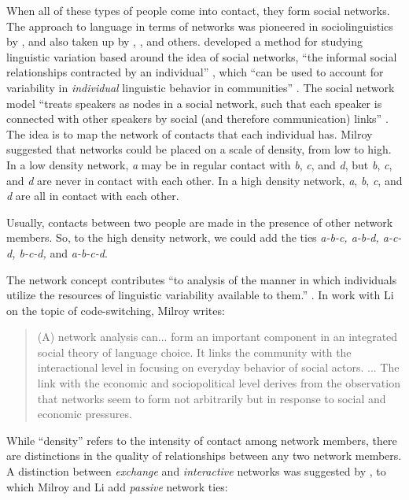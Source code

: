 When all of these types of people come into contact, they form social networks. The approach to language in terms of networks was pioneered in sociolinguistics by \citet{milroy_language_1980}, and also taken up by \citet{le_page_acts_1985}, \citet{ross_social_1997}, and others. \citet{milroy_language_1980} developed a method for studying linguistic variation based around the idea of social networks, ``the informal social relationships contracted by an individual'' \citep[174]{milroy_language_1980}, which ``can be used to account for variability in \textit{individual }linguistic behavior in communities'' \citep[21]{milroy_language_1980}. The social network model ``treats speakers as nodes in a social network, such that each speaker is connected with other speakers by social (and therefore communication) links'' \citep[213]{ross_social_1997}. The idea is to map the network of contacts that each individual has. Milroy suggested that networks could be placed on a scale of density, from low to high. In a low density network, \textit{a} may be in regular contact with \textit{b}, \textit{c}, and \textit{d}, but \textit{b}, \textit{c}, and \textit{d} are never in contact with each other. In a high density network, \textit{a}, \textit{b}, \textit{c}, and \textit{d} are all in contact with each other.

Usually, contacts between two people are made in the presence of other network members. So, to the high density network, we could add the ties \textit{a-b-c, a-b-d, a-c-d, b-c-d, }and \textit{a-b-c-d}.

The network concept contributes ``to analysis of the manner in which individuals utilize the resources of linguistic variability available to them.'' \citep[175]{milroy_language_1980}. In work with Li on the topic of code-switching, Milroy writes:

	\begin{quotation} (A) network analysis can... form an important component in an integrated social theory of language choice. It links the community with the interactional level in focusing on everyday behavior of social actors. ...  The link with the economic and sociopolitical level derives from the observation that networks seem to form not arbitrarily but in response to social and economic pressures. \citep[155]{milroy_social_1995}
	\end{quotation}
	
While 	 ``density'' refers to the intensity of contact among network members, there are distinctions in the quality of relationships between any two network members. A distinction between \textit{exchange} and \textit{interactive} networks was suggested by \citet{milardo_families_1988}, to which Milroy and Li add \textit{passive} network ties:

